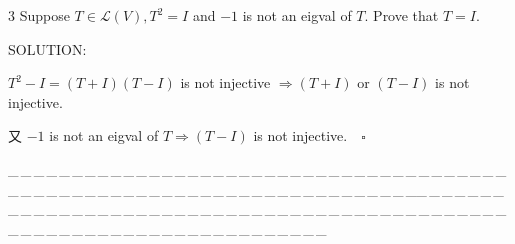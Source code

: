 \documentclass[a4paper, 11pt, UTF8]{article}
\def\Lm{\mathcal{L}}
\begin{document}
\begin{large}
{\timesbf\Large 3} {\timessl\Large 
Suppose $T\in\Lm(V),T^2=I$ and $-1$ is not an eigval of $T.$ Prove that $T=I.$
}\par
{\timesbf S\footnotesize{OLUTION:}}\par\quad
$T^2-I=(T+I)(T-I)$ is not injective $\Rightarrow (T+I)$ or $(T-I)$ is not injective.\par\quad
又 $-1$ is not an eigval of $T\Rightarrow (T-I)$ is not injective.$\quad\square$\par
{\tiny \_\,\_\,\_\,\_\,\_\,\_\,\_\,\_\,\_\,\_\,\_\,\_\,\_\,\_\,\_\,\_\,\_\,\_\,\_\,\_\,\_\,\_\,\_\,\_\,\_\,\_\,\_\,\_\,\_\,\_\,\_\,\_\,\_\,\_\,\_\,\_\,\_\,\_\,\_\,\_\,\_\,\_\,\_\,\_\,\_\,\_\,\_\,\_\,\_\,\_\,\_\,\_\,\_\,\_\,\_\,\_\,\_\,\_\,\_\,\_\,\_\,\_\,\_\,\_\,\_\,\_\,\_\,\_\,\_\,\_\,\_\_\,\_\,\_\,\_\,\_\,\_\,\_\,\_\,\_\,\_\,\_\,\_\,\_\,\_\,\_\,\_\,\_\,\_\,\_\,\_\,\_\,\_\,\_\,\_\,\_\,\_\,\_\,\_\,\_\,\_\,\_\,\_\,\_\,\_\,\_\,\_\,\_\,\_\,\_\,\_\,\_\,\_\,\_\,\_\,\_\,\_\,\_\,\_\,\_\,\_\,\_\,\_\,\_\,\_\,\_\,\_\,\_\,\_\,\_\,\_\,\_\,\_\,\_\,\_\,\_\,\_\,\_\,\_\,\_\,\_\,\_}\par


\end{large}
\end{document}
